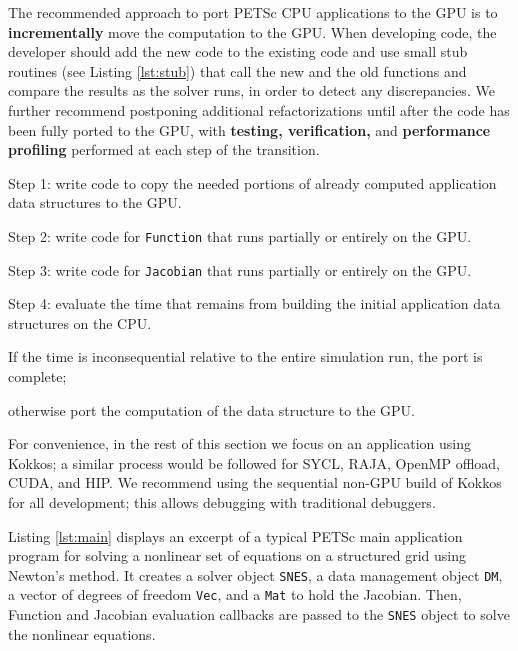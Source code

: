 \documentclass[5p,times]{elsarticle}
\newenvironment{titemize} %
        {\begin{list}{\labelitemi}{
                \setlength{\topsep}{0pt}
                \setlength{\parskip}{0pt}
                \setlength{\itemsep}{0pt}
                \setlength{\parsep}{0pt}
                \setlength{\leftmargin}{23pt}
                \setlength{\labelwidth}{23pt}
        }}
        {\end{list}}
\begin{document}
The recommended approach to port PETSc CPU applications to the GPU is to {\bf incrementally} move the computation to the GPU.
When developing code, the developer should add the new code to the existing code and use small stub routines (see Listing \ref{lst:stub})
that call  the new and the old functions and compare the results as the solver runs, in order to detect any
discrepancies.
We further recommend postponing additional refactorizations until after the code has been fully ported to the GPU,
with {\bf testing, verification,} and {\bf performance profiling} performed at each
step of the transition.
\begin{titemize}
   \item Step 1: write code to copy the needed portions of already computed application data structures to the GPU.
   \item Step 2: write code for {\tt  Function} that runs partially or entirely on the GPU.
   \item Step 3: write code for {\tt  Jacobian} that runs partially or entirely on the GPU.
   \item Step 4: evaluate the time that remains from building the initial application data structures on the CPU.
   \begin{titemize}
        \item If the time is inconsequential relative to the entire simulation run, the port is complete;
        \item otherwise port the computation of the data structure to the GPU.
    \end{titemize}
 \end{titemize}
For convenience, in the rest of this section we focus on an application
using Kokkos; a similar process would be followed for SYCL, RAJA, OpenMP offload,
CUDA, and HIP.  We recommend using the sequential
non-GPU build of Kokkos for all development; this allows debugging with
traditional debuggers. 

Listing \ref{lst:main} displays an excerpt of a typical PETSc main application program
for solving a nonlinear set of equations on a structured grid using Newton's method.
It creates a solver object {\tt SNES}, a data management object {\tt DM}, a vector of degrees of freedom {\tt Vec}, and a {\tt Mat} to hold the Jacobian.
Then, Function and Jacobian evaluation callbacks are passed to the {\tt SNES} object to solve the nonlinear equations.
\end{document}

